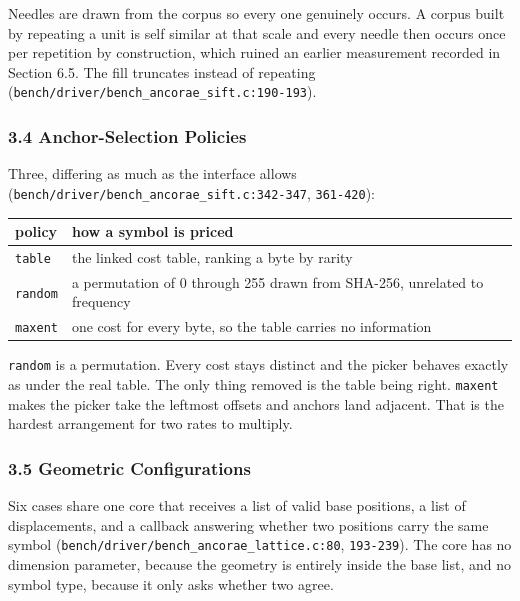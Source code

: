 Needles are drawn from the corpus so every one genuinely occurs. A corpus built by repeating a unit is self similar at that scale and every needle then occurs once per repetition by construction, which ruined an earlier measurement recorded in Section 6.5. The fill truncates instead of repeating (\texttt{bench/\allowbreak{}driver/\allowbreak{}bench\_\allowbreak{}ancorae\_\allowbreak{}sift.\allowbreak{}c:190-\allowbreak{}193}).

\subsubsection{3.4 Anchor-Selection Policies}

Three, differing as much as the interface allows (\texttt{bench/\allowbreak{}driver/\allowbreak{}bench\_\allowbreak{}ancorae\_\allowbreak{}sift.\allowbreak{}c:342-\allowbreak{}347}, \texttt{361-\allowbreak{}420}):

\tiny
\setlength{\tabcolsep}{2pt}
\begin{longtable}{@{}>{\raggedright\arraybackslash}p{}>{\raggedright\arraybackslash}p{}@{}}
\toprule
policy & how a symbol is priced \\
\midrule
\texttt{table} & the linked cost table, ranking a byte by rarity \\
\texttt{random} & a permutation of 0 through 255 drawn from SHA-256, unrelated to frequency \\
\texttt{maxent} & one cost for every byte, so the table carries no information \\
\bottomrule
\end{longtable}
\normalsize

\texttt{random} is a permutation. Every cost stays distinct and the picker behaves exactly as under the real table. The only thing removed is the table being right. \texttt{maxent} makes the picker take the leftmost offsets and anchors land adjacent. That is the hardest arrangement for two rates to multiply.

\subsubsection{3.5 Geometric Configurations}

Six cases share one core that receives a list of valid base positions, a list of displacements, and a callback answering whether two positions carry the same symbol (\texttt{bench/\allowbreak{}driver/\allowbreak{}bench\_\allowbreak{}ancorae\_\allowbreak{}lattice.\allowbreak{}c:80}, \texttt{193-\allowbreak{}239}). The core has no dimension parameter, because the geometry is entirely inside the base list, and no symbol type, because it only asks whether two agree.

